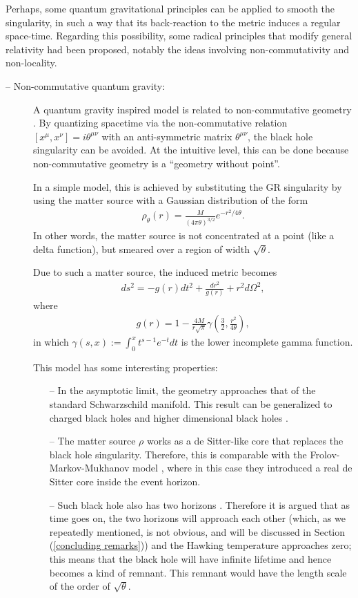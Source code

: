 \documentclass[12pt]{article}
\newcommand{\2}{$^2$}
\newcommand{\3}{$^3$}
\newcommand{\4}{$_4$}
\newcommand{\5}{$_5$}
\begin{document}
Perhaps, some quantum gravitational principles can be applied to smooth the singularity, in such a way that its back-reaction to the metric induces a regular space-time. Regarding this possibility, some radical principles that modify general relativity had been proposed, notably the ideas involving non-commutativity and non-locality.
\begin{description}
\item[-- Non-commutative quantum gravity:] A quantum gravity inspired model is related to non-commutative geometry \cite{Nicolini:2005vd,PN}. By quantizing spacetime via the non-commutative relation $[x^{\mu},x^{\nu}] = i \theta^{\mu\nu}$ with an anti-symmetric matrix $\theta^{\mu\nu}$, the black hole singularity can be avoided. At the intuitive level, this can be done because non-commutative geometry is a ``geometry without point''.

In a simple model, this is achieved by substituting the GR singularity by using the matter source with a Gaussian distribution of the form 
\begin{eqnarray}
\rho_{\theta}(r) = \frac{M}{(4\pi \theta)^{3/2}} e^{-r^{2}/4\theta}. 
\end{eqnarray}
In other words, the matter source is not concentrated at a point (like a delta function), but smeared over a region of width $\sqrt{\theta}$. 

Due to such a matter source, the induced metric becomes
\begin{eqnarray}
ds^{2} = - g(r) dt^{2} + \frac{dr^{2}}{g(r)} + r^{2} d\Omega^{2},
\end{eqnarray}
where
\begin{eqnarray}
g(r) = 1- \frac{4M}{r\sqrt{\pi}} \gamma\left( \frac{3}{2}, \frac{r^{2}}{4\theta}\right),
\end{eqnarray}
in which $\gamma(s,x):=\int_0^x t^{s-1}e^{-t} dt$ is the lower incomplete gamma function.

This model has some interesting properties:
\begin{itemize}
\item[--] In the asymptotic limit, the geometry approaches that of the standard Schwarzschild manifold. This result can be generalized to charged black holes \cite{Ansoldi:2006vg} and higher dimensional black holes \cite{Spallucci:2009zz}.
\item[--] The matter source $\rho$ works as a de Sitter-like core that replaces the black hole singularity. Therefore, this is comparable with the Frolov-Markov-Mukhanov model \cite{Frolov:1988vj}, where in this case they introduced a real de Sitter core inside the event horizon. 
\item[--] Such black hole also has two horizons \cite{0611130,1204.0143}. Therefore it is argued that as time goes on, the two horizons will approach each other (which, as we repeatedly mentioned, is not obvious, and will be discussed in Section (\ref{concluding remarks})) and the Hawking temperature approaches zero; this means that the black hole will have infinite lifetime and hence becomes a kind of remnant. This remnant would have the length scale of the order of $\sqrt{\theta}$.
\end{itemize}


\end{description}
\end{document}
